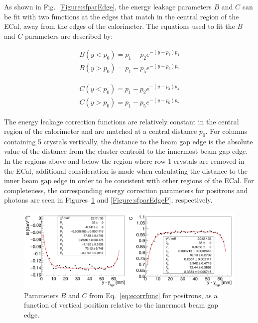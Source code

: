 As shown in Fig.~\ref{Figure:sfparEdge}, the energy leakage parameters $B$ and $C$ can be fit with two functions at the edges that match in the central region of the ECal, away from the edges of the calorimeter. The equations used to fit the $B$ and $C$ parameters are described by:

\begin{equation}
\begin{split}
\label{eq:p1parlt}
B(y<p_0) = p_1-p_2 e^{-(y-p_3)p_4}\\
B(y>p_0) = p_1-p_5 e^{-(y-p_6)p_7}
\end{split}
\end{equation}

\begin{equation}
\begin{split}
\label{eq:p2parlt}
C(y<p_0) = p_1-p_2 e^{-(y-p_3)p_4}\\
C(y>p_0) = p_1-p_5 e^{-(y-p_6)p_7}
\end{split}
\end{equation}

The energy leakage correction functions are relatively constant in the central region of the calorimeter and are matched at a central distance $p_0$. For columns containing 5 crystals vertically, the distance to the beam gap edge is the absolute value of the distance from the cluster centroid to the innermost beam gap edge. In the regions above and below the region where row 1 crystals are removed in the ECal, additional consideration is made when calculating the distance to the inner beam gap edge in order to be consistent with other regions of the ECal. For completeness, the corresponding energy correction parameters for positrons and photons are seen in Figures~\ref{Figure:sfparEdgeEP} and \ref{Figure:sfparEdgeP}, respectively. 

\begin{figure}[htb]
  \centering
      \includegraphics[width=1.0\textwidth]{pics/performance/sfparEdge_ep.png}
  \caption[ECal energy shower parameters for positrons relative to the inside beam gap edge]{Parameters $B$ and $C$ from Eq.~\ref{eq:ecorrfunc} for positrons, as a function of vertical position
relative to the innermost beam gap edge.}
  \label{Figure:sfparEdgeEP}
\end{figure}

